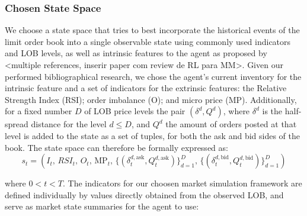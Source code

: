 \subsubsection{Chosen State Space}
We choose a state space that tries to best incorporate the historical events of the limit order book into a single observable state using commonly used indicators and LOB levels, as well as intrinsic features to the agent as proposed by <multiple references, inserir paper com review de RL para MM>. Given our performed bibliographical research, we chose the agent's current inventory for the intrinsic feature and a set of indicators for the extrinsic features: the Relative Strength Index (RSI); order imbalance (O); and micro price (MP). Additionally, for a fixed number $D$ of LOB price levels the pair $(\delta^d, Q^d)$, where $\delta^d$ is the half-spread distance for the level $d \leq D$, and $Q^d$ the amount of orders posted at that level is added to the state as a set of tuples, for both the ask and bid sides of the book. The state space can therefore be formally expressed as:
\[
    s_{t} = (I_t, \, RSI_t, \, O_t, \, \text{MP}_t, \, \{ (\delta_t^{d, \text{ask}}, Q_t^{d, \text{ask}}) \}_{d=1}^D, \, \{ (\delta_t^{d, \text{bid}}, Q_t^{d, \text{bid}}) \}_{d=1}^D)
\]

where $0 < t < T$. The indicators for our choosen market simulation framework are defined individually by values directly obtained from the observed LOB, and serve as market state summaries for the agent to use:

